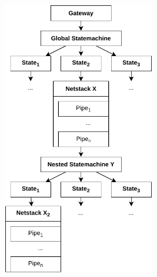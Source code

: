 \begin{figure}[h]
    \centering
    \includegraphics[height=12cm]{img/ch05/pipeline.pdf}
    \label{fig:pipeline}
\end{figure}